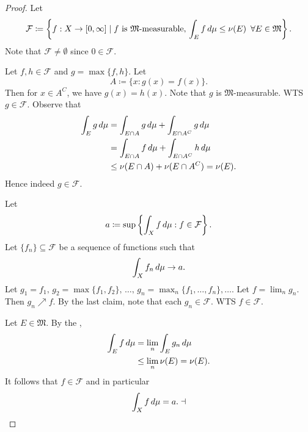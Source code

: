\documentclass[notoc,notitlepage]{tufte-book}
\begin{document}
\begin{proof}
  Let
  \begin{equation*}
    \mathcal{F} \coloneqq \left\{ f : X \to [0, \infty]
      \mid f \text{ is } \mathfrak{M}\text{-measurable},\,
        \int_{E} f \mathop{}\!d{\mu} \leq \nu(E) \enspace \forall E \in \mathfrak{M} \right\}.
  \end{equation*}
  Note that $\mathcal{F} \neq \emptyset$ since $0 \in \mathcal{F}$.

  \noindent
  Let $f, h \in \mathcal{F}$ and $g = \max \{ f, h \}$.
  Let
  \begin{equation*}
    A \coloneqq \{ x : g(x) = f(x) \}.
  \end{equation*}
  Then for $x \in A^C$, we have $g(x) = h(x)$.
  Note that $g$ is $\mathfrak{M}$-measurable.
  WTS $g \in \mathcal{F}$.
  Observe that
  \begin{align*}
    \int_{E} g \mathop{}\!d{\mu}
    &= \int_{E \cap A} g \mathop{}\!d{\mu} + \int_{E \cap A^C} g \mathop{}\!d{\mu} \\
    &= \int_{E \cap A}  f \mathop{}\!d{\mu} + \int_{E \cap A^C} h \mathop{}\!d{\mu} \\
    &\leq \nu(E \cap A) + \nu(E \cap A^C)
     = \nu(E).
  \end{align*}
  Hence indeed $g \in \mathcal{F}$. \dashv

  \noindent
  Let
  \begin{equation*}
    a \coloneqq \sup \left\{ \int_{X} f \mathop{}\!d{\mu} : f \in \mathcal{F} \right\}.
  \end{equation*}
  Let $\{f_n\} \subseteq \mathcal{F}$ be a sequence of functions such that
  \begin{equation*}
    \int_{X} f_n \mathop{}\!d{\mu} \to a.
  \end{equation*}
  Let $g_1 = f_1,\, g_2 = \max \{ f_1, f_2 \},\, \ldots,\,
  g_n = \max_{n} \{ f_1, \ldots, f_n \}, \ldots$.
  Let $f = \lim_{n} g_n$. Then $g_n \nearrow f$.
  By the last claim, note that each $g_n \in \mathcal{F}$.
  WTS $f \in \mathcal{F}$.

  Let $E \in \mathfrak{M}$. By the ,
  \begin{align*}
    \int_{E} f \mathop{}\!d{\mu} &= \lim_{n} \int_{E} g_n \mathop{}\!d{\mu} \\
              &\leq \lim_{n} \nu(E) = \nu(E).
  \end{align*}
  It follows that $f \in \mathcal{F}$ and in particular
  \begin{equation*}
    \int_{X} f \mathop{}\!d{\mu} = a. \dashv
  \end{equation*}


\end{proof}
\end{document}
